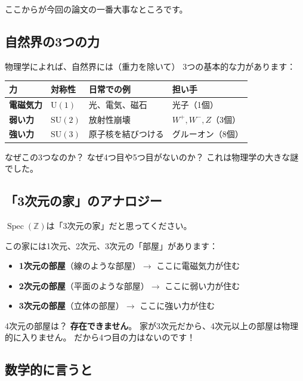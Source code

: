 \documentclass[12pt,a4paper]{article}
\newcommand{\Spec}{\operatorname{Spec}}
\begin{document}
ここからが今回の論文の一番大事なところです。

\subsection{自然界の3つの力}

物理学によれば、自然界には（重力を除いて）
3つの基本的な力があります：

\begin{center}
\begin{tabular}{llll}
\toprule
力 & 対称性 & 日常での例 & 担い手 \\
\midrule
\textbf{電磁気力} & $\mathrm{U}(1)$ & 光、電気、磁石 & 光子（1個） \\
\textbf{弱い力} & $\mathrm{SU}(2)$ & 放射性崩壊 & $W^+, W^-, Z$（3個） \\
\textbf{強い力} & $\mathrm{SU}(3)$ & 原子核を結びつける & グルーオン（8個） \\
\bottomrule
\end{tabular}
\end{center}

なぜこの3つなのか？ なぜ4つ目や5つ目がないのか？
これは物理学の大きな謎でした。

\subsection{「3次元の家」のアナロジー}

\begin{analogy}[3部屋の家]
$\Spec(\mathbb{Z})$は「3次元の家」だと思ってください。

この家には1次元、2次元、3次元の「部屋」があります：
\begin{itemize}
  \item \textbf{1次元の部屋}（線のような部屋）$\to$ ここに電磁気力が住む
  \item \textbf{2次元の部屋}（平面のような部屋）$\to$ ここに弱い力が住む
  \item \textbf{3次元の部屋}（立体の部屋）$\to$ ここに強い力が住む
\end{itemize}

4次元の部屋は？ \textbf{存在できません}。
家が3次元だから、4次元以上の部屋は物理的に入りません。
だから4つ目の力はないのです！
\end{analogy}

\subsection{数学的に言うと}
\end{document}
